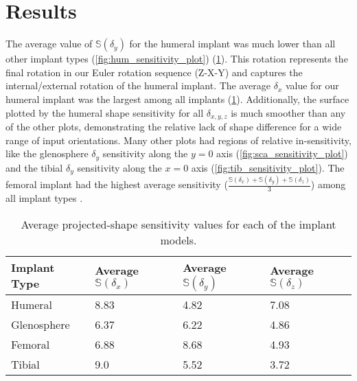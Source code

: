 \section{Results}

The average value of $\mathbb{S}(\delta_{y})$ for the humeral implant was much lower than all other implant types (\cref{fig:hum_sensitivity_plot}) (\cref{tab:ss-vals}).
This rotation represents the final rotation in our Euler rotation sequence (Z-X-Y) and captures the internal/external rotation of the humeral implant.
The average $\delta_{x}$ value for our humeral implant was the largest among all implants (\cref{tab:ss-vals}).
Additionally, the surface plotted by the humeral shape sensitivity for all $\delta_{x,y,z}$ is much smoother than any of the other plots, demonstrating the relative lack of shape difference for a wide range of input orientations.
Many other plots had regions of relative in-sensitivity, like the glenosphere $\delta_{y}$ sensitivity along the $y=0$ axis (\cref{fig:sca_sensitivity_plot}) and the tibial $\delta_{y}$ sensitivity along the $x=0$ axis (\cref{fig:tib_sensitivity_plot}).
The femoral implant had the highest average sensitivity ($\frac{\mathbb{S}(\delta_{x}) +\mathbb{S}(\delta_{y}) +\mathbb{S}(\delta_{z})  }{3}$) among all implant types .


\begin{table}
	\caption{Average projected-shape sensitivity values for each of the implant models.} \label{tab:ss-vals}
	\begin{tabularx}{\textwidth}{|X|X|X|X|}\hline
		{\bf Implant Type} & Average $\mathbb{S}(\delta_{x})$ & Average  $\mathbb{S}(\delta_{y})$ & Average $\mathbb{S}(\delta_{z})$ \\ \hline
		Humeral            & 8.83                             & 4.82                              & 7.08                             \\\hline
		Glenosphere        & 6.37                             & 6.22                              & 4.86                             \\\hline
		Femoral            & 6.88                             & 8.68                              & 4.93                             \\\hline
		Tibial             & 9.0                              & 5.52                              & 3.72                             \\\hline
	\end{tabularx}
\end{table}


